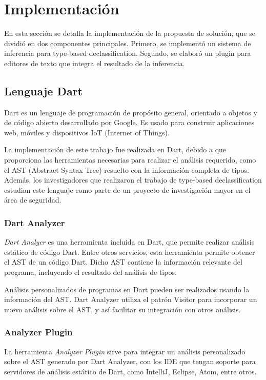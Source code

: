 \chapter{Implementación}
En esta sección se detalla la implementación de la propuesta de solución, que se dividió en dos componentes principales. Primero, se implementó un sistema de inferencia para type-based declassification. Segundo, se elaboró un plugin para editores de texto que integra el resultado de la inferencia.

\section{Lenguaje Dart}
Dart es un lenguaje de programación de propósito general, orientado a objetos y de código abierto desarrollado por Google. Es usado para construir aplicaciones web, móviles y dispositivos IoT (Internet of Things).

La implementación de este trabajo fue realizada en Dart, debido a que proporciona las herramientas necesarias para realizar el análisis requerido, como el AST (Abstract Syntax Tree) resuelto con la información completa de tipos. Además, los investigadores que realizaron el trabajo de type-based declassification estudian este lenguaje como parte de un proyecto de investigación mayor en el área de seguridad.

\subsection{Dart Analyzer}
\emph{Dart Analyer} es una herramienta incluida en Dart, que permite realizar análisis estático de código Dart. Entre otros servicios, esta herramienta permite obtener el AST de un código Dart. Dicho AST contiene la información relevante del programa, incluyendo el resultado del análisis de tipos.

Análisis personalizados de programas en Dart pueden ser realizados usando la información del AST. Dart Analyzer utiliza el patrón Visitor para incorporar un nuevo análisis sobre el AST, y así facilitar su integración con otros análisis.

\subsection{Analyzer Plugin}
La herramienta \emph{Analyzer Plugin} sirve para integrar un análisis personalizado sobre el AST generado por Dart Analyzer, con los IDE que tengan soporte para servidores de análisis estático de Dart, como IntelliJ, Eclipse, Atom, entre otros.


